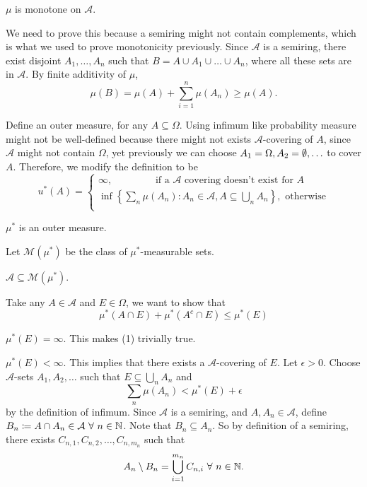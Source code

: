 \documentclass[class=article,crop=false]{standalone}
\begin{document}
\begin{prf}
\begin{claim}[]
$ \mu$ is monotone on $ \mathcal{A}$.
\end{claim}

We need to prove this because a semiring might not contain complements, which is what we used to prove monotonicity previously. Since $ \mathcal{A}$ is a semiring, there exist disjoint $ A_1, \ldots, A_n$ such that $ B = A \cup A_1 \cup \ldots \cup A_n$, where all these sets are in $ \mathcal{A}$. By finite additivity of $ \mu$,
\[
	\mu(B) = \mu(A) + \sum_{ i= 1}^{ n} \mu(A_n) \geq \mu(A)
.\] 

Define an outer measure, for any $ A \subseteq \Omega$. Using infimum like probability measure might not be well-defined because there might not exists $ \mathcal{A}$-covering of $ A$, since $ \mathcal{A}$ might not contain $ \Omega$, yet previously we can choose $ A_1 = \Omega, A_2 = \emptyset, \ldots$ to cover $ A$. Therefore, we modify the definition to be
\begin{equation*}
	u^* (A)=
\begin{cases}
\infty,\qquad  \qquad  \text{ if a } \mathcal{A} \text{ covering doesn't exist for } A \\
\inf\left\{\sum_n \mu(A_n): A_n \in \mathcal{A}, A \subseteq \bigcup _{ n} A_n \right\},  \text{ otherwise} \\
\end{cases}
\end{equation*}
\begin{claim}[]
$ \mu^* $ is an outer measure.
\end{claim}
Let $ \mathcal{M}(\mu^* )$ be the class of $ \mu^* $-measurable sets.
\begin{claim}[]
	$ \mathcal{A} \subseteq \mathcal{M}(\mu^* )$.
\end{claim}
Take any $ A \in \mathcal{A}$ and $ E \in \Omega$, we want to show that
\begin{equation}
	\mu^* (A \cap E) + \mu^* (A^{c} \cap E) \leq \mu^* (E) 
\end{equation}
\begin{case}[]
	$ \mu^* (E) = \infty$. This makes (1) trivially true. 
\end{case}
\begin{case}[]
	$ \mu^* (E) < \infty$. This implies that there exists a $ \mathcal{A}$-covering of $ E$. Let  $ \epsilon>0$. Choose $ \mathcal{A}$-sets $ A_1,A_2,\ldots$ such that $ E \subseteq \bigcup_{ n} A_n $ and 
\[
	\sum_n \mu(A_n) < \mu^* (E) + \epsilon
\] 
by the definition of infimum. Since $ \mathcal{A}$ is a semiring, and $ A, A_n \in \mathcal{A}$, define $ B_n \coloneqq A \cap  A_n \in \mathcal{A} \ \forall \ n \in \mathbb{N}$. Note that $ B_n \subseteq A_n$. So by definition of a semiring, there exists $ C_{n,1},C_{n,2},\ldots,C_{n,m_n}$ such that 
\[
A_n \setminus B_n = \bigcup_{ i= 1}^{m_n} C_{n,i} \ \forall \ n \in \mathbb{N} 
.\]


\end{case}
\end{prf}
\end{document}
